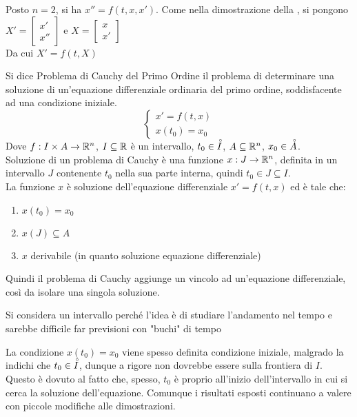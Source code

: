 \begin{example}
	Posto $n=2$, si ha $x''=f(t, x, x')$.
	Come nella dimostrazione della , si pongono $X'= \begin{bmatrix} x'\\ x'' \end{bmatrix}$ e $X=\begin{bmatrix}x\\ x'\end{bmatrix}$\\
	Da cui $X'=f(t,X)$
\end{example}

\begin{definition}
	\label{def:prob_cauchy_ord_1}
	Si dice Problema di Cauchy del Primo Ordine il problema di determinare una soluzione di un'equazione differenziale ordinaria del primo ordine, soddisfacente ad una condizione iniziale.
	\[\begin{cases}x'=f(t,x)\\x(t_0)=x_0\end{cases}\]
	Dove $f:I\times A\to \mathbb{R}^n$, $I\subseteq \mathbb{R}$ è un intervallo, $t_0\in\accentset{\circ}{I}$, $A\subseteq \mathbb{R}^n$, $x_0\in\accentset{\circ}{A}$.\\
	Soluzione di un problema di Cauchy è una funzione $x:J\to \mathbb{R}^n$, definita in un intervallo $J$ contenente $t_0$ nella sua parte interna, quindi $t_0\in J\subseteq I$.\\
	La funzione $x$ è soluzione dell'equazione differenziale $x'=f(t,x)$ ed è tale che:
	\begin{enumerate}
		\item $x(t_0)=x_0$
		\item $x(J)\subseteq A$
		\item $x$ derivabile (in quanto soluzione equazione differenziale)
	\end{enumerate}
	Quindi il problema di Cauchy aggiunge un vincolo ad un'equazione differenziale, così da isolare una singola soluzione.
\end{definition}
\begin{note}
	Si considera un intervallo perché l'idea è di studiare l'andamento nel tempo e sarebbe difficile far previsioni con "buchi" di tempo
\end{note}
\begin{note}
	La condizione $x(t_0) = x_0$ viene spesso definita condizione iniziale, malgrado la  indichi che $t_0 \in \accentset{\circ}{I}$, dunque a rigore non dovrebbe essere sulla frontiera di $I$. Questo è dovuto al fatto che, spesso, $t_0$ è proprio all'inizio dell'intervallo in cui si cerca la soluzione dell'equazione.\newline
	Comunque i risultati esposti continuano a valere con piccole modifiche alle dimostrazioni.
\end{note}

